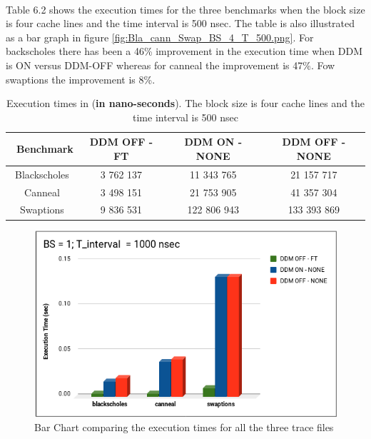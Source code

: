 \documentclass{listhesis}
\begin{document}
\\
Table 6.2 shows the execution times for the three benchmarks when the block size is four cache lines and the time interval is 500 nsec. The table is also illustrated as a bar graph in figure \ref{fig:Bla_cann_Swap_BS_4_T_500.png}. For backscholes there has been a 46\% improvement in the execution time when DDM is ON versus DDM-OFF whereas for canneal the improvement is 47\%. Fow swaptions the improvement is 8\%.
\begin{table}[h!]
\begin{center}
 \begin{tabular}{|| c | c | c | c||} 
 \hline
 \ \textbf{Benchmark} & \textbf{DDM OFF - FT}  & \textbf{DDM ON - NONE}  & \textbf{DDM OFF - NONE}\\ [0.5 ex] 
 \hline\hline
  Blackscholes   &   3 762 137   &   11 343 765	    &  21 157 717 \\ 
 \hline
   Canneal  	&   3 498 151    &   21 753 905   	&   41 357 304   \\
 \hline
    Swaptions   &   9 836 531     &   122 806 943 	&   133 393 869   \\
 \hline
\end{tabular}
 \caption{Execution times in (\textbf{in nano-seconds}). The block size is four cache lines and the time interval is 500 nsec}
 \label{table:ExecTimes2}
\end{center}
\end{table}

\begin{figure}
  \includegraphics[width=\linewidth]{Bla_cann_Swap_BS_1_T_1000.png}
  \centering
  \caption{Bar Chart comparing the execution times for all the three trace files}
  \label{fig:Bla_cann_Swap_BS_1_T_1000.png}
\end{figure}
\end{document}
